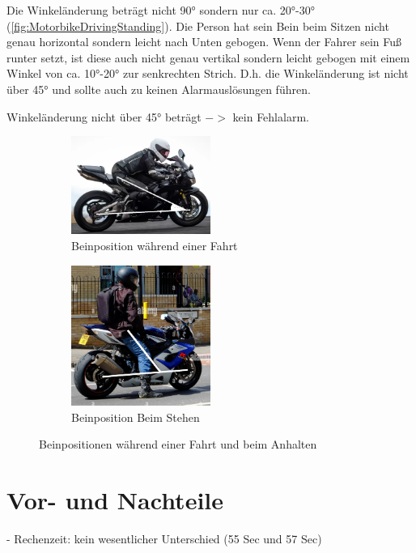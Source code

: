 Die Winkeländerung beträgt nicht \ang{90} sondern nur ca. \ang{20}-\ang{30} (\autoref{fig:MotorbikeDrivingStanding}). Die Person hat sein Bein beim Sitzen nicht genau horizontal sondern leicht nach Unten gebogen. Wenn der Fahrer sein Fuß runter setzt, ist diese auch nicht genau vertikal sondern leicht gebogen mit einem Winkel von ca. \ang{10}-\ang{20} zur senkrechten Strich. D.h. die Winkeländerung ist nicht über \ang{45} und sollte auch zu keinen Alarmauslösungen führen.


Winkeländerung nicht über \ang{45} beträgt $->$ kein Fehlalarm.

\begin{figure}
	\centering
	\begin{subfigure}{\textwidth}
		\centering
		\includegraphics[width=0.5\textwidth]{Bilder/MotorbikeDriving2.png}
		\caption{Beinposition während einer Fahrt}
		\label{fig:MotorbikeDriving}
	\end{subfigure}
	\hfill
	\begin{subfigure}{\textwidth}
		\centering
		\includegraphics[width=0.5\textwidth]{Bilder/MotorbikeStanding2.png}
		\caption{Beinposition Beim Stehen}
		\label{fig:MotorbikeStanding2}
	\end{subfigure}
	\caption{Beinpositionen während einer Fahrt und beim Anhalten}
	\label{fig:MotorbikeDrivingStanding}
\end{figure}


\section{Vor- und Nachteile}
- Rechenzeit: kein wesentlicher Unterschied (55 Sec und 57 Sec)





 